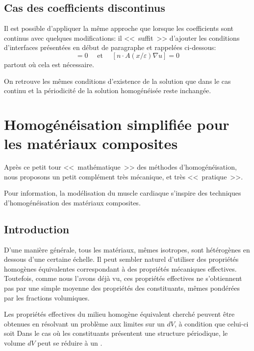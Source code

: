 \medskip
\subsection{Cas des coefficients discontinus}
Il est possible d'appliquer la même approche que lorsque les coefficients sont continus
avec quelques modifications: il <<~suffit~>> d'ajouter les conditions d'interfaces présentées
en début de paragraphe et rappelées ci-dessous:
\begin{equation} [u]=0 \quad \text{ et } \quad [n\cdot A(x/\varepsilon)\nabla u] = 0\end{equation}
partout où cela est nécessaire.

On retrouve les mêmes conditions d'existence de la solution que dans le cas
continu et la périodicité de la solution homogénéisée reste inchangée.



\medskip
\section{Homogénéisation simplifiée pour les matériaux composites}

Après ce petit tour <<~mathématique~>> des méthodes d'homogénéisation,
nous proposons un petit complément très mécanique, et très <<~pratique~>>.

\medskip
Pour information, la modélisation du muscle cardiaque s'inspire des techniques d'homogénéisation
des matériaux composites.


\medskip
\subsection{Introduction}

D'une manière générale, tous les matériaux, mêmes isotropes, sont hétérogènes
en dessous d'une certaine échelle.
Il peut sembler naturel d'utiliser des propriétés homogènes équivalentes correspondant
à des propriétés mécaniques effectives.
Toutefois, comme nous l'avons déjà vu, ces propriétés effectives ne s'obtiennent pas par
une simple moyenne des propriétés des constituants, mêmes  pondérées par les fractions
volumiques.

\medskip
Les propriétés effectives du milieu homogène équivalent cherché peuvent être obtenues
en résolvant un problème aux limites sur un  $dV$, à condition
que celui-ci soit 
Dans le cas où les constituants présentent une structure périodique, le volume $dV$ peut se
réduire à un .

